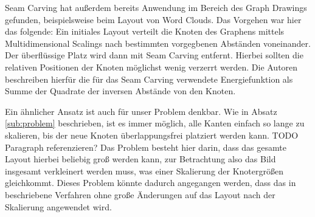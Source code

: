 Seam Carving hat außerdem bereits Anwendung im Bereich des Graph Drawings gefunden, beispielsweise beim Layout von Word Clouds.\cite{wu2011semantic} Das Vorgehen war hier das folgende: Ein initiales Layout verteilt die Knoten des Graphens mittels Multidimensional Scalings nach bestimmten vorgegbenen Abständen voneinander. Der überflüssige Platz wird dann mit Seam Carving entfernt. Hierbei sollten die relativen Positionen der Knoten möglichst wenig verzerrt werden. Die Autoren beschreiben hierfür die für das Seam Carving verwendete Energiefunktion als Summe der Quadrate der inversen Abstände von den Knoten.

Ein ähnlicher Ansatz ist auch für unser Problem denkbar. Wie in Absatz \ref{sub:problem} beschrieben, ist es immer möglich, alle Kanten einfach so lange zu skalieren, bis der neue Knoten überlappungsfrei platziert werden kann. TODO Paragraph referenzieren? Das Problem besteht hier darin, dass das gesamte Layout hierbei beliebig groß werden kann, zur Betrachtung also das Bild insgesamt verkleinert werden muss, was einer Skalierung der Knotergrößen gleichkommt. Dieses Problem könnte dadurch angegangen werden, dass das in \cite{wu2011semantic} beschriebene Verfahren ohne große Änderungen auf das Layout nach der Skalierung angewendet wird.
